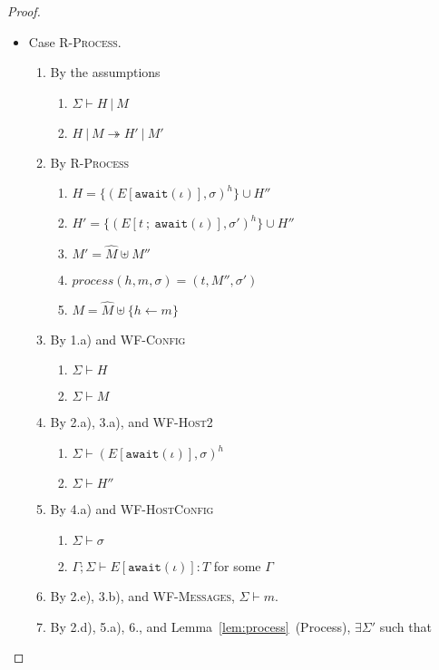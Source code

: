 \begin{proof}
\begin{itemize}
\item Case \textsc{R-Process}.
\begin{enumerate}
\item By the assumptions
  \begin{enumerate}[label=(\alph*)]
  \item $\Sigma \vdash H~|~M$
  \item $H~|~M \twoheadrightarrow H'~|~M'$
  \end{enumerate}
\item By \textsc{R-Process}
  \begin{enumerate}[label=(\alph*)]
  \item $H  = \{ (E[\texttt{await}(\iota)], \sigma)^h \} \cup H''$
  \item $H' = \{ (E[t~;~\texttt{await}(\iota)], \sigma')^h \} \cup H''$
  \item $M' = \hat{M} \uplus M''$
  \item $process(h, m, \sigma) = (t, M'', \sigma')$
  \item $M = \hat{M} \uplus \{ h \leftarrow m \}$
  \end{enumerate}
\item By 1.a) and \textsc{WF-Config}
  \begin{enumerate}[label=(\alph*)]
  \item $\Sigma \vdash H$
  \item $\Sigma \vdash M$
  \end{enumerate}
\item By 2.a), 3.a), and \textsc{WF-Host2}
  \begin{enumerate}[label=(\alph*)]
  \item $\Sigma \vdash (E[\texttt{await}(\iota)], \sigma)^h$
  \item $\Sigma \vdash H''$
  \end{enumerate}
\item By 4.a) and \textsc{WF-HostConfig}
  \begin{enumerate}[label=(\alph*)]
  \item $\Sigma \vdash \sigma$
  \item $\Gamma ; \Sigma \vdash E[\texttt{await}(\iota)] : T$ for some $\Gamma$
  \end{enumerate}
\item By 2.e), 3.b), and \textsc{WF-Messages}, $\Sigma \vdash m$.
\item By 2.d), 5.a), 6., and Lemma~\ref{lem:process}~(Process), $\exists \Sigma'$ such that
  \begin{enumerate}[label=(\alph*)]

\end{enumerate}
\end{enumerate}
\end{itemize}
\end{proof}
